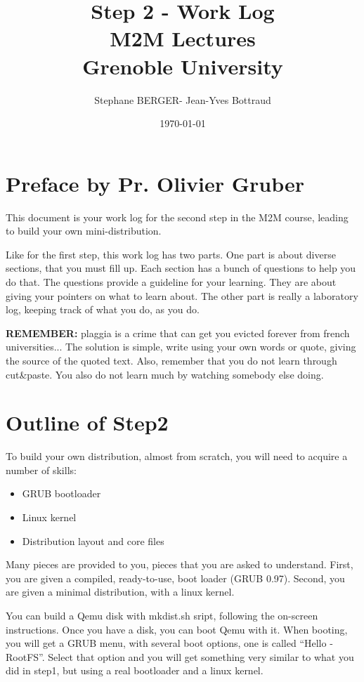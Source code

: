 \documentclass[10]{article}
\begin{document}
\title{Step 2 - Work Log \\
M2M Lectures\\
Grenoble University}
\author{Stephane BERGER- Jean-Yves Bottraud}
\date{\today}
\maketitle

\section{Preface by Pr. Olivier Gruber}

This document is your work log for the second step in the 
M2M course, leading to build your own mini-distribution.

Like for the first step, this work log has two parts. 
One part is about diverse sections, that you must fill up.
Each section has a bunch of questions to help you do that.
The questions provide a guideline for your learning. 
They are about giving your pointers on what to learn about.
The other part is really a laboratory log, 
keeping track of what you do, as you do.

{\bf REMEMBER:} plaggia is a crime that can get you evicted
forever from french universities... The solution is simple,
write using your own words or quote, giving the source of
the quoted text. Also, remember that you do not learn through
cut\&paste. You also do not learn much by watching somebody else
doing.

\section{Outline of Step2}

To build your own distribution, almost from scratch, you will need
to acquire a number of skills:

\begin{itemize}
\item
GRUB bootloader
\item
Linux kernel
\item
Distribution layout and core files
\end{itemize}

Many pieces are provided to you, pieces that you are asked to understand.
First, you are given a compiled, ready-to-use, boot loader (GRUB 0.97).
Second, you are given a minimal distribution, with a linux kernel.

You can build a Qemu disk with mkdist.sh sript, following the on-screen
instructions. Once you have a disk, you can boot Qemu with it.
When booting, you will get a GRUB menu, with several boot options,
one is called ``Hello - RootFS''.
Select that option and you will get something very similar 
to what you did in step1, but using a real bootloader and a linux kernel.
\end{document}
